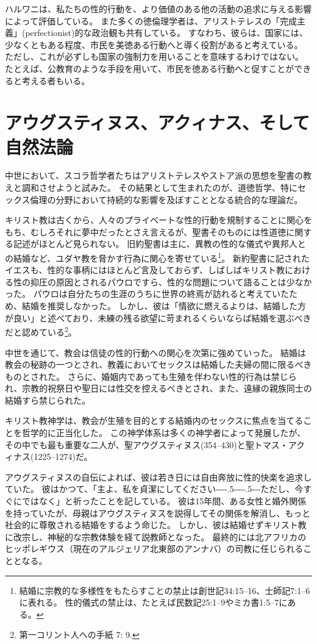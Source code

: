 \documentclass[paper=a4,book,openany]{jlreq}
\newcommand{\ig}[1]{}           %
\def\DDASH{―\kern-.5\zw―\kern-.5\zw―}
\begin{document}
 ハルワニは、私たちの性的行動を、より価値のある他の活動の追求に与える影響によって評価している。
また多くの徳倫理学者は、アリストテレスの「完成主義」(perfectionist)的な政治観も共有している。
すなわち、彼らは、国家には、少なくともある程度、市民を美徳ある行動へと導く役割があると考えている。
ただし、これが必ずしも国家の強制力を用いることを意味するわけではない。
たとえば、公教育のような手段を用いて、市民を徳ある行動へと促すことができると考える者もいる。

\section{アウグスティヌス、アクィナス、そして自然法論}

中世において、スコラ哲学者たちはアリストテレスやストア派の思想を聖書の教えと調和させようと試みた。
その結果として生まれたのが、道徳哲学、特にセックス倫理の分野において持続的な影響を及ぼすこととなる統合的な理論だ。

キリスト教は古くから、人々のプライベートな性的行動を規制することに関心をもち、むしろそれに夢中だったとさえ言えるが、聖書そのものには性道徳に関する記述がほとんど見られない。
旧約聖書は主に、異教の性的な儀式や異邦人との結婚など、ユダヤ教を脅かす行為に関心を寄せている\footnote{結婚に宗教的な多様性をもたらすことの禁止は創世記34:15--16、士師記7:1--6に表れる。
性的儀式の禁止は、たとえば民数記25:1--9やミカ書1:5--7にある。
}。
新約聖書に記されたイエス\ig{イエス・キリスト}も、性的な事柄にはほとんど言及しておらず、しばしばキリスト教における性の抑圧の原因とされるパウロ\ig{聖パウロ}ですら、性的な問題について語ることは少なかった。
パウロは自分たちの生涯のうちに世界の終焉が訪れると考えていたため、結婚を推奨しなかった。
しかし、彼は「情欲に燃えるよりは、結婚した方が良い」と述べており、未練の残る欲望に苛まれるくらいならば結婚を選ぶべきだと認めている\footnote{第一コリント人への手紙 7: 9.}。

中世を通じて、教会は信徒の性的行動への関心を次第に強めていった。
結婚は教会の秘跡の一つとされ、教義においてセックスは結婚した夫婦の間に限るべきものとされた。
さらに、婚姻内であっても生殖を伴わない性的行為は禁じられ、宗教的祝祭日や聖日には性交を控えるべきとされ、また、遠縁の親族同士の結婚すら禁じられた。

キリスト教神学は、教会が生殖を目的とする結婚内のセックスに焦点を当てることを哲学的に正当化した。
この神学体系は多くの神学者によって発展したが、その中でも最も重要な二人が、聖アウグスティヌス(354--430)と聖トマス・アクィナス(1225--1274)だ。

アウグスティヌスの自伝によれば、彼は若き日には自由奔放に性的快楽を追求していた。
彼はかつて、「主よ、私を貞潔にしてください{\DDASH}ただし、今すぐにではなく」と祈ったことを記している。
彼は15年間、ある女性と婚外関係を持っていたが、母親はアウグスティヌスを説得してその関係を解消し、もっと社会的に尊敬される結婚をするよう命じた。
しかし、彼は結婚せずキリスト教に改宗し、神秘的な宗教体験を経て説教師となった。
最終的には北アフリカのヒッポレギウス（現在のアルジェリア北東部のアンナバ）の司教に任じられることとなる。
\end{document}
